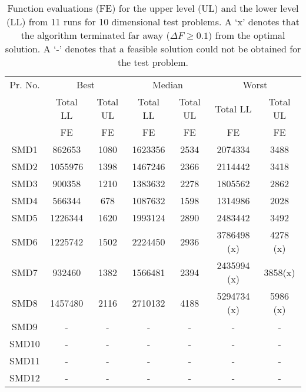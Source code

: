 \documentclass[twoside]{article}
\begin{document}
\begin{table*}[hbt]
\caption{Function evaluations (FE) for the upper level (UL) and the lower level (LL) from 11
  runs for 10 dimensional test problems. A `x' denotes that the algorithm terminated far away ($\Delta F \ge 0.1$) from the optimal solution. A `-' denotes that a feasible solution could not be obtained for the test problem.} 
\label{tab:table2a}
{\small\begin{center}
\begin{tabular}{|c|c|c|c|c|c|c|} \hline
Pr. No.	&	\multicolumn{2}{|c|}{Best}	&	\multicolumn{2}{|c|}{Median}	&	\multicolumn{2}{|c|}{Worst}	\\	\cline{2-7}
	&		\multicolumn{1}{|c|}{Total LL}	&	\multicolumn{1}{|c|}{Total UL}	&	\multicolumn{1}{|c|}{Total LL}	&	\multicolumn{1}{|c|}{Total UL}	&	\multicolumn{1}{|c|}{Total LL}	&\multicolumn{1}{|c|}{Total UL}	\\	
	&	\multicolumn{1}{|c|}{FE} 	&
        \multicolumn{1}{|c|}{FE}	&\multicolumn{1}{|c|}{FE}         &\multicolumn{1}{|c|}{FE}        &
        \multicolumn{1}{|c|}{FE}& \multicolumn{1}{|c|}{FE}	\\ \hline	
SMD1 & 862653 & 1080 & 1623356 & 2534 & 2074334 & 3488	\\	\hline
SMD2 & 1055976 & 1398 & 1467246 & 2366 & 2114442 & 3418	\\	\hline
SMD3 & 900358 & 1210 & 1383632 & 2278 & 1805562 & 2862	\\	\hline
SMD4 & 566344 & 678 & 1087632 & 1598 & 1314986 & 2028	\\	\hline
SMD5 & 1226344 & 1620 & 1993124 & 2890 & 2483442 & 3492	\\	\hline
SMD6 & 1225742 & 1502 & 2224450 & 2936 & 3786498 (x) & 4278 (x)	\\	\hline
SMD7 & 932460 & 1382 & 1566481 & 2394 & 2435994 (x) & 3858(x) \\	\hline
SMD8 & 1457480 & 2116 & 2710132 & 4188 & 5294734 (x) & 5986 (x)  \\	\hline
SMD9 & - & - & - & - & - & -  \\	\hline
SMD10 & - & - & - & - & - & -  \\	\hline
SMD11 & -& -& -& -& -& - \\ \hline
SMD12 & -& -& -& -& -& - \\ \hline
\end{tabular}
\end{center}}
\end{table*}
\end{document}
